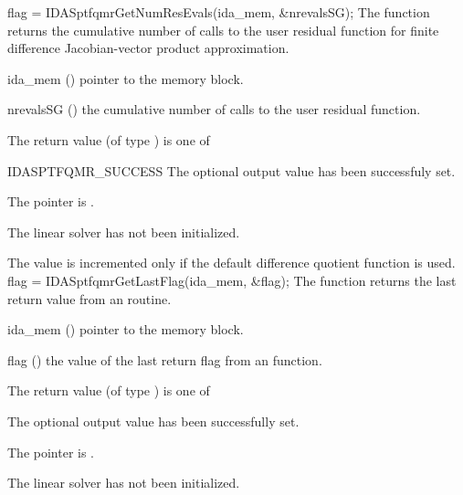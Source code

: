 {}
{
  flag = IDASptfqmrGetNumResEvals(ida\_mem, \&nrevalsSG);
}
{
  The function  returns the
  cumulative number of calls to the user residual function for
  finite difference Jacobian-vector product approximation.
}
{
  \begin{args}[nrevalsSG]
  \item[ida\_mem] ()
    pointer to the {\ida} memory block.
  \item[nrevalsSG] ()
    the cumulative number of calls to the user residual function.
  \end{args}
}
{
  The return value  (of type ) is one of
  \begin{args}
  \item[IDASPTFQMR\_SUCCESS] 
    The optional output value has been successfuly set.
  \item[\Id{IDASPTFQMR\_MEM\_NULL}]
    The  pointer is .
  \item[\Id{IDASPTFQMR\_LMEM\_NULL}]
    The {\idasptfqmr} linear solver has not been initialized.
  \end{args}
}
{
  The value  is incremented only if the default 
   difference quotient function is used.
}
{
  flag = IDASptfqmrGetLastFlag(ida\_mem, \&flag);
}
{
  The function  returns the
  last return value from an {\idasptfqmr} routine. 
}
{
  \begin{args}
  \item[ida\_mem] ()
    pointer to the {\ida} memory block.
  \item[flag] ()
    the value of the last return flag from an {\idasptfqmr} function.
  \end{args}
}
{
  The return value  (of type ) is one of
  \begin{args}
  \item[\Id{IDASPTFQMR\_SUCCESS}] 
    The optional output value has been successfully set.
  \item[\Id{IDASPTFQMR\_MEM\_NULL}]
    The  pointer is .
  \item[\Id{IDASPTFQMR\_LMEM\_NULL}]
    The {\idasptfqmr} linear solver has not been initialized.
  \end{args}
}
